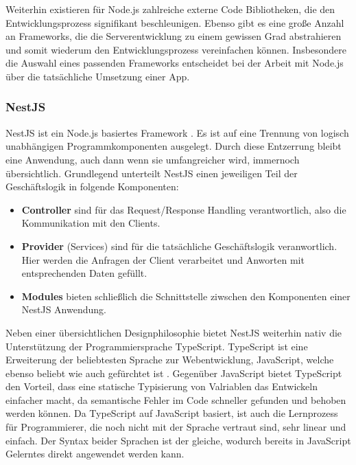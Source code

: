 Weiterhin existieren für Node.js zahlreiche externe Code Bibliotheken, die den Entwicklungsprozess signifikant beschleunigen.
Ebenso gibt es eine große Anzahl an Frameworks, die die Serverentwicklung zu einem gewissen Grad abstrahieren und somit wiederum den Entwicklungsprozess vereinfachen können.
Insbesondere die Auswahl eines passenden Frameworks entscheidet bei der Arbeit mit Node.js über die tatsächliche Umsetzung einer App.

\subsubsection*{NestJS}
NestJS ist ein Node.js basiertes Framework \autocite{B_NestJs.}.
Es ist auf eine Trennung von logisch unabhängigen Programmkomponenten ausgelegt.
Durch diese Entzerrung bleibt eine Anwendung, auch dann wenn sie umfangreicher wird, immernoch übersichtlich.
Grundlegend unterteilt NestJS einen jeweiligen Teil der Geschäftslogik in folgende Komponenten:
\begin{itemize}
    \item \textbf{Controller} sind für das Request/Response Handling verantwortlich, also die Kommunikation mit den Clients.
    \item \textbf{Provider} (Services) sind für die tatsächliche Geschäftslogik veranwortlich. Hier werden die Anfragen der Client verarbeitet und Anworten mit entsprechenden Daten gefüllt.
    \item \textbf{Modules} bieten schließlich die Schnittstelle ziwschen den Komponenten einer NestJS Anwendung.
\end{itemize}
Neben einer übersichtlichen Designphilosophie bietet NestJS weiterhin nativ die Unterstützung der Programmiersprache TypeScript.
TypeScript ist eine Erweiterung der beliebtesten Sprache zur Webentwicklung, JavaScript, welche ebenso beliebt wie auch gefürchtet ist \autocite{B_Stackoverflow.2020}.
Gegenüber JavaScript bietet TypeScript den Vorteil, dass eine statische Typisierung von Valriablen das Entwickeln einfacher macht, da semantische Fehler im Code schneller gefunden und behoben werden können.
Da TypeScript auf JavaScript basiert, ist auch die Lernprozess für Programmierer, die noch nicht mit der Sprache vertraut sind, sehr linear und einfach.
Der Syntax beider Sprachen ist der gleiche, wodurch bereits in JavaScript Gelerntes direkt angewendet werden kann.

